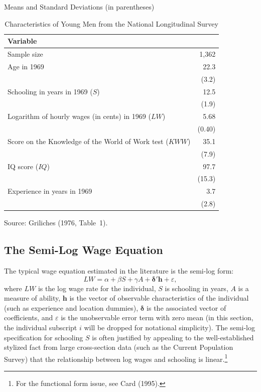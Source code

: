 \begin{table}[htbp]
\centering
\caption{Characteristics of Young Men from the National Longitudinal Survey}
\label{tab:3.1}
\medskip
Means and Standard Deviations (in parentheses)
\medskip

\begin{tabular}{@{}l r@{}}
\toprule
Variable & \\
\midrule
Sample size & 1{,}362 \\[4pt]
Age in 1969 & 22.3 \\
 & (3.2) \\[4pt]
Schooling in years in 1969 ($S$) & 12.5 \\
 & (1.9) \\[4pt]
Logarithm of hourly wages (in cents) in 1969 ($LW$) & 5.68 \\
 & (0.40) \\[4pt]
Score on the Knowledge of the World of Work test ($KWW$) & 35.1 \\
 & (7.9) \\[4pt]
IQ score ($IQ$) & 97.7 \\
 & (15.3) \\[4pt]
Experience in years in 1969 & 3.7 \\
 & (2.8) \\
\bottomrule
\end{tabular}

\smallskip
{\footnotesize Source: Griliches (1976, Table~1).}
\end{table}

\subsection*{The Semi-Log Wage Equation}

The typical wage equation estimated in the literature is the semi-log form:
\begin{equation}
  LW = \alpha + \beta S + \gamma A + \boldsymbol{\delta}'\mathbf{h} + \varepsilon,
  \label{eq:3.9.1}
\end{equation}
where $LW$ is the log wage rate for the individual, $S$ is schooling in years, $A$ is a
measure of ability, $\mathbf{h}$ is the vector of observable characteristics of the individual
(such as experience and location dummies), $\boldsymbol{\delta}$ is the associated vector of coefficients,
and $\varepsilon$ is the unobservable error term with zero mean (in this section, the
individual subscript $i$ will be dropped for notational simplicity).  The semi-log
specification for schooling $S$ is often justified by appealing to the well-established
stylized fact from large cross-section data (such as the Current Population Survey)
that the relationship between log wages and schooling is linear.\footnote{For the
functional form issue, see Card (1995).}

